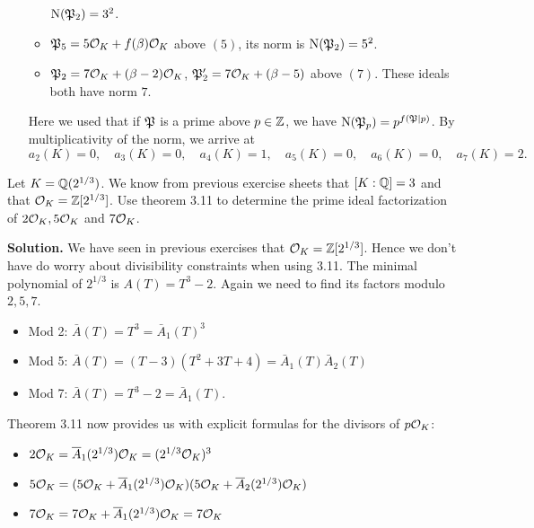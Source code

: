 \documentclass[a4paper,11pt]{article}
\begin{document}
\begin{enumerate}[labelindent=0pt, wide]
\begin{itemize}
                $\operatorname{N}(\mathfrak{P}_2) = 3^2$.
            \item $\mathfrak{P}_5 = 5 \mathcal{O}_K + f(\beta) \mathcal{O}_K$ above $(5)$, its norm is 
                $\operatorname{N}(\mathfrak{P}_2) = 5^2$.
            \item $\mathfrak{P}_2 = 7 \mathcal{O}_K + (\beta-2) \mathcal{O}_K$, $\mathfrak{P}_2' = 
                7 \mathcal{O}_K + (\beta-5)$ above $(7)$. These ideals both have norm
                $7$.
        \end{itemize}
        Here we used that if $\mathfrak{P}$ is a prime above $p \in \mathbb{Z}$, 
        we have $\operatorname{N}(\mathfrak{P}_p) = p^{f(\mathfrak{P}|p)}$.
        By multiplicativity of the norm, we arrive at
        \begin{equation*}
            a_2(K) = 0, \quad
            a_3(K) = 0, \quad
            a_4(K) = 1, \quad
            a_5(K) = 0, \quad
            a_6(K) = 0, \quad
            a_7(K) = 2.
        \end{equation*}
\end{enumerate}

Let $K=\mathbb{Q}(2^{1/3})$. We know from previous exercise sheets that $[K:\mathbb{Q}] = 3$
and that $\mathcal{O}_K = \mathbb{Z}[2^{1/3}]$. Use theorem 3.11 to determine the prime ideal
factorization of $2 \mathcal{O}_K, 5\mathcal{O}_K$ and $7\mathcal{O}_K$.

\textbf{Solution.} We have seen in previous exercises that 
$\mathcal{O}_K = \mathbb{Z}[2^{1/3}]$. Hence we don't have do worry about divisibility
constraints when using 3.11. The minimal polynomial of $2^{1/3}$ is 
$A(T) = T^3 - 2$. Again we need to find its factors modulo $2,5, 7$. 
\begin{itemize}
    \item Mod 2: $\bar A(T) = T^3 = \bar A_1(T)^3$
    \item Mod 5: $\bar A(T) = (T-3)(T^2+3T+4) = \bar A_1(T) \bar A_2(T)$
    \item Mod 7: $\bar A(T) = T^3 - 2 = \bar A_1(T)$. 
\end{itemize}
Theorem 3.11 now provides us with explicit formulas for the divisors of 
$p \mathcal{O}_K$:
\begin{itemize}
    \item $2\mathcal{O}_K = \overline A_1(2^{1/3})\mathcal{O}_K = (2^{1/3}\mathcal{O}_K)^3$
    \item $5\mathcal{O}_K = (5\mathcal{O}_K + \overline A_1(2^{1/3})\mathcal{O}_K)(5 \mathcal{O}_K + \overline
        A_2(2^{1/3})\mathcal{O}_K)$
    \item $7\mathcal{O}_K = 7 \mathcal{O}_K + \overline A_1(2^{1/3})\mathcal{O}_K = 7\mathcal{O}_K$
\end{itemize}
\end{document}
